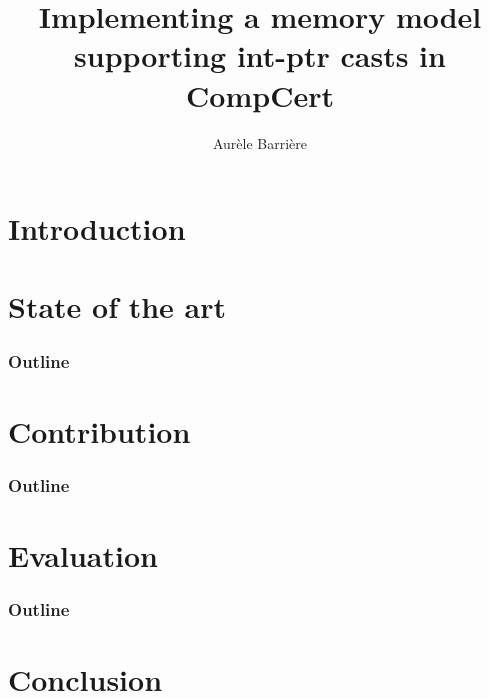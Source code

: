 \documentclass[page number]{beamer}
\begin{document}
\title[Int-Ptr casts in CompCert]{Implementing a memory model supporting int-ptr casts in CompCert}


\author{Aur\`ele Barri\`ere}


\def\outline{
  \begin{frame}
    \frametitle{Outline}
    \tableofcontents[currentsection]
  \end{frame}
}

\begin{frame}[plain]
  \titlepage%
\end{frame}

\def\outline{
  \begin{frame}
    \frametitle{Outline}
    \tableofcontents[currentsection]
  \end{frame}
}

\section{Introduction}


\section{State of the art}
\outline


\section{Contribution}
\outline


\section{Evaluation}
\outline


\section{Conclusion}

\end{document}
